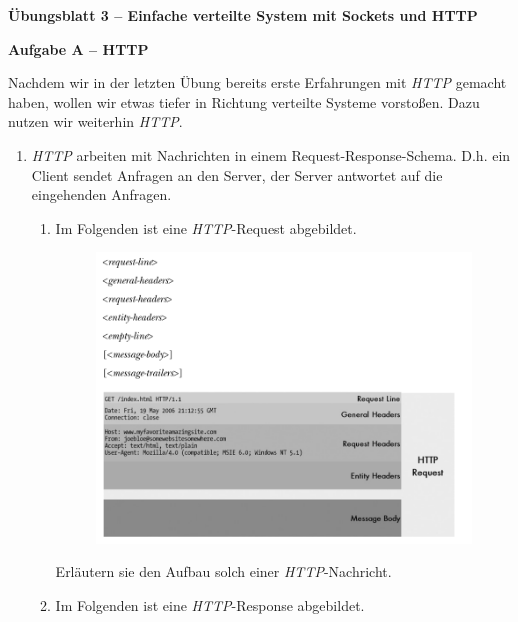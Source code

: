 \documentclass[paper=a4,fontsize=11pt]{scrartcl}%
\numberwithin{equation}{section}
\begin{document}
\begin{center}
\Large{\textbf{Übungsblatt 3 -- Einfache verteilte System mit Sockets und HTTP}}
\end{center}

\begin{center}\Large{\textbf{Aufgabe A -- HTTP}}\end{center}\vskip0.25in

Nachdem wir in der letzten Übung bereits erste Erfahrungen mit \emph{HTTP} gemacht haben, wollen wir etwas tiefer in Richtung verteilte Systeme vorstoßen. Dazu nutzen wir weiterhin \emph{HTTP}.
\begin{enumerate}
	\item \emph{HTTP} arbeiten mit Nachrichten in einem Request-Response-Schema. D.h. ein Client sendet Anfragen an den Server, der Server antwortet auf die eingehenden Anfragen.
	\begin{enumerate}
		\item Im Folgenden ist eine \emph{HTTP}-Request abgebildet.
		\begin{figure}[h]
	\includegraphics[scale=0.4]{http_req}
	\end{figure}
	Erläutern sie den Aufbau solch einer \emph{HTTP}-Nachricht.
	\item Im Folgenden ist eine \emph{HTTP}-Response abgebildet.
	\begin{figure}[H]

\end{figure}
\end{enumerate}
\end{enumerate}
\end{document}
